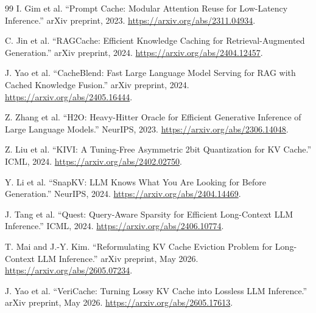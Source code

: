 \documentclass[11pt]{article}
\begin{document}
\begin{thebibliography}{99}
I. Gim et al.
\newblock ``Prompt Cache: Modular Attention Reuse for Low-Latency Inference.''
\newblock arXiv preprint, 2023.
\newblock \url{https://arxiv.org/abs/2311.04934}.

C. Jin et al.
\newblock ``RAGCache: Efficient Knowledge Caching for Retrieval-Augmented Generation.''
\newblock arXiv preprint, 2024.
\newblock \url{https://arxiv.org/abs/2404.12457}.

J. Yao et al.
\newblock ``CacheBlend: Fast Large Language Model Serving for RAG with Cached Knowledge
Fusion.''
\newblock arXiv preprint, 2024.
\newblock \url{https://arxiv.org/abs/2405.16444}.

Z. Zhang et al.
\newblock ``H2O: Heavy-Hitter Oracle for Efficient Generative Inference of Large
Language Models.''
\newblock NeurIPS, 2023.
\newblock \url{https://arxiv.org/abs/2306.14048}.

Z. Liu et al.
\newblock ``KIVI: A Tuning-Free Asymmetric 2bit Quantization for KV Cache.''
\newblock ICML, 2024.
\newblock \url{https://arxiv.org/abs/2402.02750}.

Y. Li et al.
\newblock ``SnapKV: LLM Knows What You Are Looking for Before Generation.''
\newblock NeurIPS, 2024.
\newblock \url{https://arxiv.org/abs/2404.14469}.

J. Tang et al.
\newblock ``Quest: Query-Aware Sparsity for Efficient Long-Context LLM Inference.''
\newblock ICML, 2024.
\newblock \url{https://arxiv.org/abs/2406.10774}.

T. Mai and J.-Y. Kim.
\newblock ``Reformulating KV Cache Eviction Problem for Long-Context LLM Inference.''
\newblock arXiv preprint, May 2026.
\newblock \url{https://arxiv.org/abs/2605.07234}.

J. Yao et al.
\newblock ``VeriCache: Turning Lossy KV Cache into Lossless LLM Inference.''
\newblock arXiv preprint, May 2026.
\newblock \url{https://arxiv.org/abs/2605.17613}.

\end{thebibliography}
\end{document}
